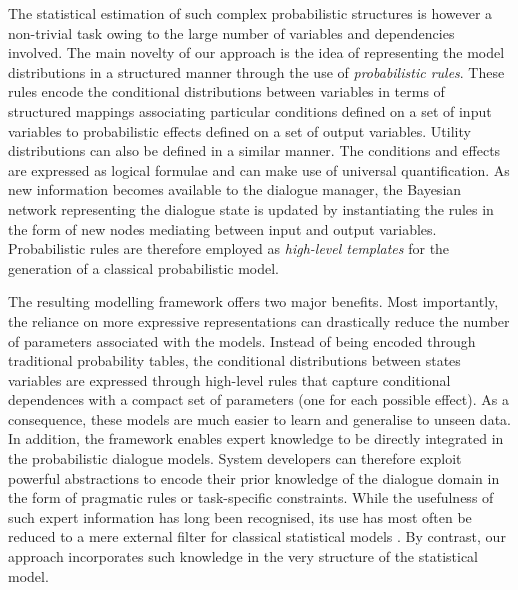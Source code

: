 The statistical estimation of such complex probabilistic structures is however a non-trivial task owing to the large number of variables and dependencies involved. The main novelty of our approach is the idea of representing the model distributions in a structured manner through the use of \textit{probabilistic rules}.  These rules encode the conditional distributions between variables in terms of structured mappings associating particular conditions defined on a set of input variables to probabilistic effects defined on a set of output variables.  Utility distributions can also be defined in a similar manner. The conditions and effects are expressed as logical formulae and can make use of universal quantification. As new information becomes available to the dialogue manager, the Bayesian network representing the dialogue state is updated by instantiating the rules in the form of new nodes mediating between input and output variables. Probabilistic rules are therefore employed as \textit{high-level templates} for the generation of a classical probabilistic model.  

The resulting modelling framework offers two major benefits. Most importantly, the reliance on more expressive representations can drastically reduce the number of parameters associated with the models.  Instead of being encoded through traditional probability tables, the conditional distributions between states variables are expressed through high-level rules that capture conditional dependences with a compact set of parameters (one for each possible effect). As a consequence, these models are much easier to learn and generalise to unseen data.  In addition, the framework enables expert knowledge to be directly integrated in the probabilistic dialogue models. System developers can therefore exploit powerful abstractions to encode their prior knowledge of the dialogue domain in the form of pragmatic rules or task-specific constraints.    
While the usefulness of such expert information has long been recognised, its use has most often be reduced to a mere external filter for classical statistical models \citep{heeman2007,williams2008}. By contrast, our approach incorporates such knowledge in the very structure of the statistical model. 

